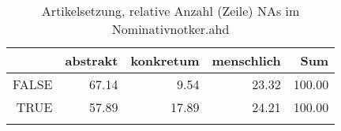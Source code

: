 \begin{table}[ht]
\centering
\begin{tabular}{rrrrr}
  \lsptoprule
 & abstrakt & konkretum & menschlich & Sum \\ 
  \midrule
FALSE & 67.14 & 9.54 & 23.32 & 100.00 \\ 
  TRUE & 57.89 & 17.89 & 24.21 & 100.00 \\ 
   \lspbottomrule
\end{tabular}
\caption{Artikelsetzung, relative Anzahl (Zeile) NAs im Nominativnotker.ahd} 
\end{table}
